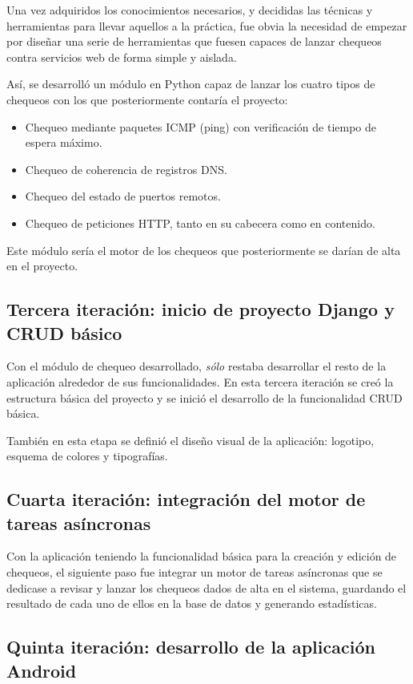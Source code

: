 Una vez adquiridos los conocimientos necesarios, y decididas las técnicas y
herramientas para llevar aquellos a la práctica, fue obvia la necesidad de
empezar por diseñar una serie de herramientas que fuesen capaces de lanzar
chequeos contra servicios web de forma simple y aislada.

Así, se desarrolló un módulo en Python capaz de lanzar los cuatro tipos de
chequeos con los que posteriormente contaría el proyecto:
\begin{itemize}
\item Chequeo mediante paquetes \ac{ICMP} (ping) con verificación de tiempo de espera máximo.
\item Chequeo de coherencia de registros \ac{DNS}.
\item Chequeo del estado de puertos remotos.
\item Chequeo de peticiones \ac{HTTP}, tanto en su cabecera como en contenido.
\end{itemize}

Este módulo sería el motor de los chequeos que posteriormente se darían de alta
en el proyecto.

\subsection{Tercera iteración: inicio de proyecto Django y CRUD básico}

Con el módulo de chequeo desarrollado, \textit{sólo} restaba desarrollar el
resto de la aplicación alrededor de sus funcionalidades. En esta tercera
iteración se creó la estructura básica del proyecto y se inició el desarrollo de
la funcionalidad \ac{CRUD} básica.

También en esta etapa se definió el diseño visual de la aplicación: logotipo,
esquema de colores y tipografías.

\subsection{Cuarta iteración: integración del motor de tareas asíncronas}

Con la aplicación teniendo la funcionalidad básica para la creación y edición de
chequeos, el siguiente paso fue integrar un motor de tareas asíncronas que se
dedicase a revisar y lanzar los chequeos dados de alta en el sistema, guardando
el resultado de cada uno de ellos en la base de datos y generando estadísticas.

\subsection{Quinta iteración: desarrollo de la aplicación Android}

